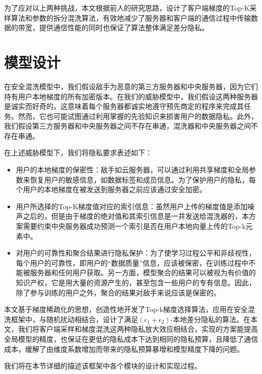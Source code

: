为了应对以上两种挑战，本文根据前人的研究思路，设计了客户端梯度的Top-K采样算法和参数的拆分混洗算法，有效地减少了服务器和客户端的通信过程中传输数据的带宽，提供通信性能的同时也保证了算法整体满足差分隐私。

\section{模型设计}
在安全混洗模型中，我们假设敌手为恶意的第三方服务器和中央服务器，因为它们持有用户本地梯度的所有加密版本。在我们的威胁模型中，我们假设这两种服务器是诚实而好奇的，这意味着每个服务器都诚实地遵守预先商定的程序来完成其任务。然而，它也可能试图通过利用掌握的先验知识来损害用户的数据隐私。此外，我们假设第三方服务器和中央服务器之间不存在串通，混洗器和中央服务器之间不存在串通。

在上述威胁模型下，我们将隐私要求表述如下：
\begin{itemize}
  \item 用户的本地梯度的保密性：敌手如云服务器，可以通过利用共享梯度和全局参数来恢复用户的敏感信息，如数据标签和成员信息。为了保护用户的隐私，每个用户的本地梯度在被发送到服务器之前应该通过安全加密。
  \item 用户所选择的Top-K梯度值对应的索引信息：虽然用户上传的梯度值是添加噪声之后的，但是由于梯度的绝对值和其索引信息是一并发送给混洗器的，本方案需要约束中央服务器成功预测一个索引是否在用户本地向量上传的Top-k元素中。
  \item 对用户的可靠性和聚合结果进行隐私保护：为了使学习过程公平和非歧视性，每个用户的可靠性，即用户的“数据质量”信息，应该被保密，在训练过程中不能被服务器和任何用户获取。另一方面，模型聚合的结果可以被视为有价值的知识产权，它是用大量的资源产生的，甚至包含一些用户的专有信息。因此，除了参与训练的用户之外，聚合的结果对敌手来说应该是保密的。
\end{itemize}

本文基于梯度稀疏化的思想，创造性地开发了Top-k梯度选择算法，应用在安全混洗框架中，与随机扰动相结合，设计了满足$\left(\epsilon_{1}+\epsilon_{2}\right)$-本地差分隐私的算法。在本文，我们将客户端采样和梯度混洗这两种隐私放大效应相结合，实现的方案能提高全局模型的精度，也保证在更低的隐私成本下达到相同的隐私预算，且降低了通信成本，缓解了由维度系数增加而带来的隐私预算暴增和模型精度下降的问题。

我们将在本节详细的描述该框架中各个模块的设计和实现过程。

